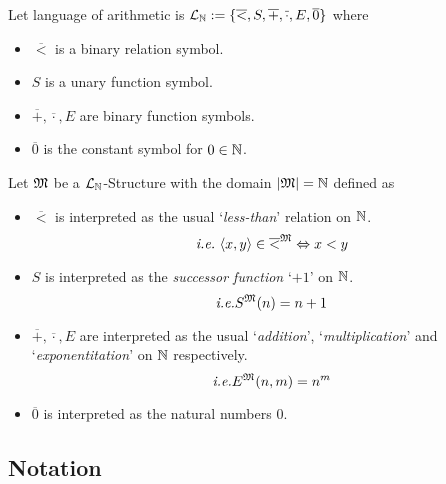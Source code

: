\documentclass[11pt,a4paper]{article}
\begin{document}
Let language of arithmetic is $\mathcal{L}_{\mathbb{N}}:=\{\overline<,S,\overline+,\overline\cdot,E,\overline0\}$ where
\begin{itemize}
	\item $\overline<$ is a binary relation symbol.
	\item $S$ is a unary function symbol.
	\item $\overline+,\overline\cdot,E$ are binary function symbols.
	\item $\overline0$ is the constant symbol for $0\in\mathbb{N}$.
\end{itemize}
Let $\mathfrak{M}$ be a $\mathcal{L}_{\mathbb{N}}$-Structure with the domain $|\mathfrak{M}|=\mathbb{N}$ defined as
\begin{itemize}
	\item $\overline<$ is interpreted as the usual `\textit{less-than}' relation on $\mathbb{N}$.
	$$\ie\ \langle x,y\rangle\in\overline<^\M\Leftrightarrow x<y$$
	\item $S$ is interpreted as the \textit{successor function} `$+1$' on $\mathbb{N}$.
	$$\textit{i.e.} S^{\mathfrak{M}}(n)=n+1$$
	\item $\overline+,\overline\cdot,E$ are interpreted as the usual `\textit{addition}', `\textit{multiplication}' and `\textit{exponentitation}' on $\mathbb{N}$ respectively.
	$$\textit{i.e.} E^{\mathfrak{M}}(n,m)=n^m$$
	\item $\overline0$ is interpreted as the natural numbers $0$.
\end{itemize}

\subsection{Notation}
\end{document}
